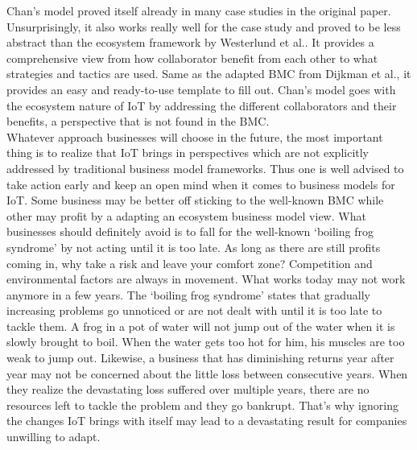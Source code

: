 		Chan's model proved itself already in many case studies in the original paper. Unsurprisingly, it also works really well for the case study and proved to be less abstract than the ecosystem framework by Westerlund et al.. It provides a comprehensive view from how collaborator benefit from each other to what strategies and tactics are used. Same as the adapted BMC from Dijkman et al., it provides an easy and ready-to-use template to fill out. Chan's model goes with the ecosystem nature of IoT by addressing the different collaborators and their benefits, a perspective that is not found in the BMC.\\
		Whatever approach businesses will choose in the future, the most important thing is to realize that IoT brings in perspectives which are not explicitly addressed by traditional business model frameworks. Thus one is well advised to take action early and keep an open mind when it comes to business models for IoT. Some business may be better off sticking to the well-known BMC while other may profit by a adapting an ecosystem business model view. What businesses should definitely avoid is to fall for the well-known `boiling frog syndrome' by not acting until it is too late. As long as there are still profits coming in, why take a risk and leave your comfort zone? Competition and environmental factors are always in movement. What works today may not work anymore in a few years. The `boiling frog syndrome' states that gradually increasing problems go unnoticed or are not dealt with until it is too late to tackle them. A frog in a pot of water will not jump out of the water when it is slowly brought to boil. When the water gets too hot for him, his muscles are too weak to jump out. Likewise, a business that has diminishing returns year after year may not be concerned about the little loss between consecutive years. When they realize the devastating loss suffered over multiple years, there are no resources left to tackle the problem and they go bankrupt. That's why ignoring the changes IoT brings with itself may lead to a devastating result for companies unwilling to adapt.
\vspace{-2em}
